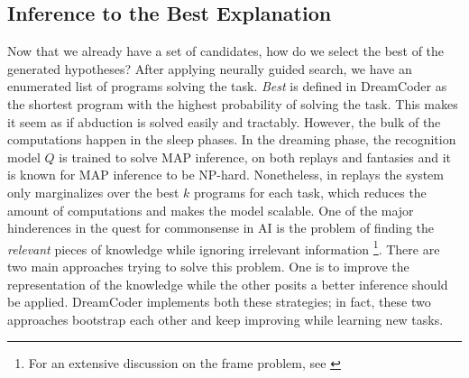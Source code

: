 \subsection{Inference to the Best Explanation}
Now that we already have a set of candidates, how do we select the best of the generated hypotheses? After applying neurally guided search, we have an enumerated list of programs solving the task. \textit{Best} is defined in DreamCoder as the shortest program with the highest probability of solving the task. This makes it seem as if abduction is solved easily and tractably. However, the bulk of the computations happen in the sleep phases. In the dreaming phase, the recognition model $Q$ is trained to solve MAP inference, on both replays and fantasies and it is known for MAP inference to be NP-hard. Nonetheless, in replays the system only marginalizes over the best $k$ programs for each task, which reduces the amount of computations and makes the model scalable. 
One of the major hinderences in the quest for commonsense in AI is the problem of finding the \emph{relevant} pieces of knowledge while ignoring irrelevant information \footnote{For an extensive discussion on the frame problem, see \cite{haselager1997}}.
There are two main approaches trying to solve this problem. One is to improve the representation of the knowledge while the other posits a better inference should be applied. DreamCoder implements both these strategies; in fact, these two approaches bootstrap each other and keep improving while learning new tasks.
